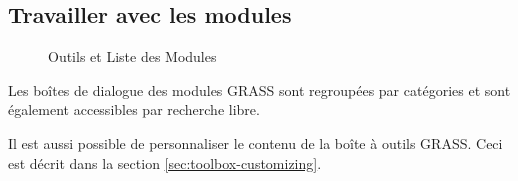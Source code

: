 {%
\subsection{Travailler avec les modules \grass}\label{grass_modules}
\begin{figure}[ht]
\centering
   \hspace{0.5cm}
\caption{Outils \grass et Liste des Modules \nixcaption}\label{fig:grass_modules}
\end{figure}

Les boîtes de dialogue des modules GRASS sont regroupées par catégories et sont également accessibles par recherche libre.


Il est aussi possible de personnaliser le contenu de la boîte à outils GRASS. Ceci est décrit dans la section \ref{sec:toolbox-customizing}.

}
